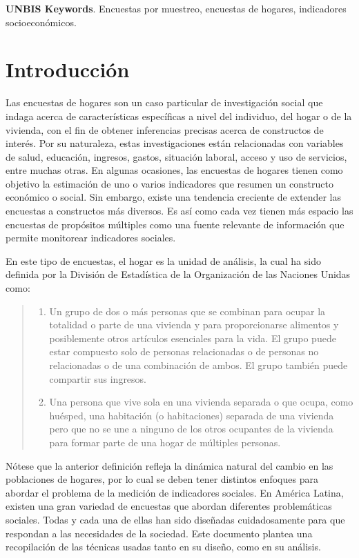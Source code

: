 \documentclass[
  12pt,
  spanish,
]{book}
\providecommand{\tightlist}{%
  \setlength{\itemsep}{0pt}\setlength{\parskip}{0pt}}
\begin{document}
\textbf{UNBIS Keywords}. Encuestas por muestreo, encuestas de hogares, indicadores socioeconómicos.

\hypertarget{introducciuxf3n}{%
\chapter{Introducción}\label{introducciuxf3n}}

Las encuestas de hogares son un caso particular de investigación social que indaga acerca de características específicas a nivel del individuo, del hogar o de la vivienda, con el fin de obtener inferencias precisas acerca de constructos de interés. Por su naturaleza, estas investigaciones están relacionadas con variables de salud, educación, ingresos, gastos, situación laboral, acceso y uso de servicios, entre muchas otras. En algunas ocasiones, las encuestas de hogares tienen como objetivo la estimación de uno o varios indicadores que resumen un constructo económico o social. Sin embargo, existe una tendencia creciente de extender las encuestas a constructos más diversos. Es así como cada vez tienen más espacio las encuestas de propósitos múltiples como una fuente relevante de información que permite monitorear indicadores sociales.

En este tipo de encuestas, el hogar es la unidad de análisis, la cual ha sido definida por la División de Estadística de la Organización de las Naciones Unidas \citep{United-Nations_2011} como:

\begin{quote}
\begin{enumerate}
\def\labelenumi{\alph{enumi}.}
\tightlist
\item
  Un grupo de dos o más personas que se combinan para ocupar la totalidad o parte de una vivienda y para proporcionarse alimentos y posiblemente otros artículos esenciales para la vida. El grupo puede estar compuesto solo de personas relacionadas o de personas no relacionadas o de una combinación de ambos. El grupo también puede compartir sus ingresos.
\item
  Una persona que vive sola en una vivienda separada o que ocupa, como huésped, una habitación (o habitaciones) separada de una vivienda pero que no se une a ninguno de los otros ocupantes de la vivienda para formar parte de una hogar de múltiples personas.
\end{enumerate}
\end{quote}

Nótese que la anterior definición refleja la dinámica natural del cambio en las poblaciones de hogares, por lo cual se deben tener distintos enfoques para abordar el problema de la medición de indicadores sociales. En América Latina, existen una gran variedad de encuestas que abordan diferentes problemáticas sociales. Todas y cada una de ellas han sido diseñadas cuidadosamente para que respondan a las necesidades de la sociedad. Este documento plantea una recopilación de las técnicas usadas tanto en su diseño, como en su análisis.
\end{document}
